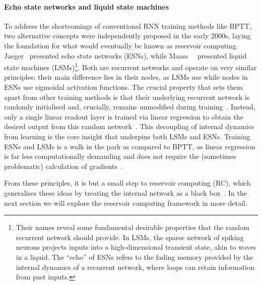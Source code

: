 \paragraph{Echo state networks and liquid state machines}
To address the shortcomings of conventional RNN training methods like BPTT, two alternative concepts were independently proposed in the early 2000s, laying the foundation for what would eventually be known as reservoir computing.
Jaeger~\cite{jaeger2001echo} presented echo state networks (ESNs), while Maass~\etal~\cite{maass_LSM} presented liquid state machines (LSMs)\footnote{
	Their names reveal some fundamental desirable properties that the random recurrent network should provide.
	In LSMs, the sparse network of spiking neurons projects inputs into a high-dimensional transient state, akin to waves in a liquid.
	The ``echo'' of ESNs refers to the fading memory provided by the internal dynamics of a recurrent network, where loops can retain information from past inputs.
}.
Both are recurrent networks and operate on very similar principles: their main difference lies in their nodes, as LSMs use  while nodes in ESNs use sigmoidal activation functions.
The crucial property that sets them apart from other training methods is that their underlying recurrent network is randomly initialised and, crucially, remains unmodified during training~\cite{ReviewESNs,RC_Tensegrity}.
Instead, only a single linear readout layer is trained via linear regression to obtain the desired output from this random network~\cite{D-LSM,D-ESN-Improved}.
This decoupling of internal dynamics from learning is the core insight that underpins both LSMs and ESNs.
Training ESNs and LSMs is a walk in the park as compared to BPTT, as linear regression is far less computationally demanding and does not require the (sometimes problematic) calculation of gradients~\cite{D-ESN-Improved}. \par
From these principles, it is but a small step to reservoir computing (RC), which generalises these ideas by treating the internal network as a black box~\cite{RC_unification,D-ESN-Improved,RC_Tensegrity}.
In the next section we will explore the reservoir computing framework in more detail.

